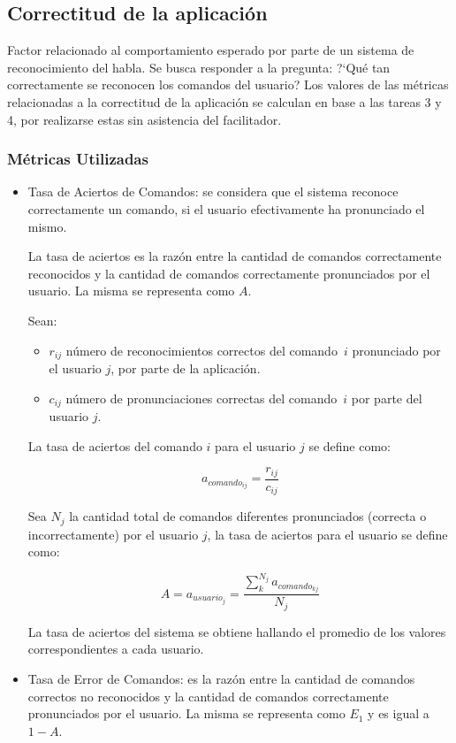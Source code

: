 \subsection{Correctitud de la aplicaci\'on}
Factor relacionado al comportamiento esperado por parte de un sistema de reconocimiento del
habla. Se busca responder a la pregunta: {?`}Qu\'e tan correctamente se reconocen los comandos 
del usuario?
Los valores de las m\'etricas relacionadas a la correctitud de la aplicaci\'on se calculan
en base a las tareas 3 y 4, por realizarse estas sin asistencia del facilitador.  
\subsubsection{M\'etricas Utilizadas}
\begin{itemize}
	\item Tasa de Aciertos de Comandos: se considera que el sistema reconoce correctamente
	un comando, si el usuario efectivamente ha pronunciado el mismo.

	La tasa de aciertos es la raz\'on entre la cantidad de comandos correctamente reconocidos 
	y la cantidad de comandos correctamente pronunciados por el usuario. 
	La misma se representa como $A$.
	
	Sean:

	\begin{itemize}
		\item $r_{ij}$ n\'umero de reconocimientos correctos del \mbox{comando $i$} pronunciado por el usuario $j$,
		por parte de la aplicaci\'on.
		\item $c_{ij}$ n\'umero de pronunciaciones correctas del \mbox{comando $i$} por parte del usuario $j$.
	\end{itemize}
	La tasa de aciertos del comando $i$ para el usuario $j$ se define como: 

	\begin{equation*}
		a_{{comando}_{ij}}=\frac{r_{ij}}{c_{ij}}
	\end{equation*}


	Sea $N_{j}$ la cantidad total de comandos diferentes pronunciados (correcta o incorrectamente) por el usuario $j$,
	la tasa de aciertos para el usuario  se define como:
	
	\begin{equation*}
		A=a_{{usuario}_j}=\frac{\sum_k^{N_{j}}a_{{comando}_{kj}}}{N_{j}}
	\end{equation*}

	La tasa de aciertos del sistema se obtiene hallando el promedio de los valores correspondientes
	a cada usuario.

	\item Tasa de Error de Comandos: es la raz\'on entre la cantidad de comandos correctos no reconocidos 
	y la cantidad de comandos correctamente pronunciados por el usuario. 
	La misma se representa como $E_1$ y es igual a $1-A$.

\end{itemize}

